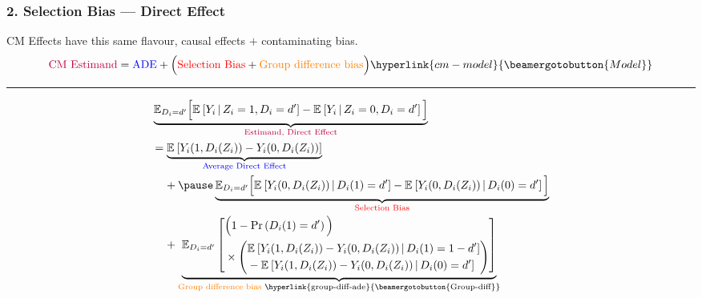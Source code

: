 \documentclass[dvipsnames]{beamer} %
\newcommand{\Prob}[1]{\Pr\left( #1 \right)}                         %
\newcommand{\E}[2][]{\mathbb{E}_{#1} \left[ #2 \right]}                    %
\newcommand{\Egiven}[3][]{\mathbb{E}_{#1} \left[ #2 \, \middle\vert \, #3 \right]} %
\begin{document}
\begin{frame}[noframenumbering]
    \frametitle{2. Selection Bias --- Direct Effect}
    \label{main:ade-selection-bias}
    CM Effects have this same flavour, causal effects $+$ contaminating bias.
    \[ \text{\textcolor{purple}{CM Estimand}}
        = \text{\textcolor{blue}{ADE}}
            + \Big(\text{\textcolor{red}{Selection Bias}}
            + \text{\textcolor{orange}{Group difference bias}}\Big)
        \hyperlink{cm-model}{\beamergotobutton{Model}} \]
    \vskip-0.25cm

    \par\noindent\rule{\textwidth}{0.4pt}
    {\footnotesize
    \begin{align*}
        & \underbrace{\mathbb E_{D_i=d'} \Big[
            \Egiven{Y_i}{Z_i = 1, D_i=d'} - \Egiven{Y_i}{Z_i = 0, D_i=d'} \Big]}_{
                \text{\textcolor{purple}{Estimand, Direct Effect}} } \\
        & = \underbrace{\E{Y_i(1, D_i(Z_i)) - Y_i(0, D_i(Z_i))}}_{
            \text{\textcolor{blue}{Average Direct Effect}}} \\
        & \;\;\;\; + 
        \pause \underbrace{ \mathbb E_{D_i=d'} \Big[ 
            \Egiven{Y_i(0, D_i(Z_i))}{D_i(1) = d'} 
            - \Egiven{Y_i(0, D_i(Z_i))}{D_i(0) = d'} \Big] }_{
                \text{\textcolor{red}{Selection Bias}}} \\
        & \;\;\;\; + \underbrace{ \E[D_i =d']{
            \begin{aligned}
            &\Big(1 - \Prob{D_i(1) = d'} \Big) \\
            &\times \left( \begin{aligned}
                &\Egiven{Y_i(1, D_i(Z_i)) - Y_i(0, D_i(Z_i))}{D_i(1) = 1-d'} \\ 
                &  - \Egiven{Y_i(1, D_i(Z_i)) - Y_i(0, D_i(Z_i))}{D_i(0) = d'}
                \end{aligned} \right) \end{aligned}} }_{
                    \text{\textcolor{orange}{Group difference bias} 
                        \hyperlink{group-diff-ade}{\beamergotobutton{Group-diff}}}}
    \end{align*}}
\end{frame}
\end{document}
